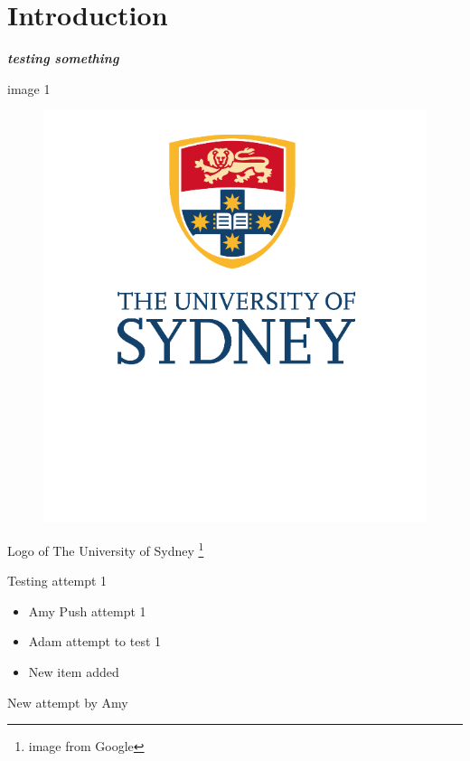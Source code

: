 \documentclass[10pt]{article}
\newcommand{\boldit}[1]{\textbf{\textit{#1}}}
\begin{document}
\section{\textsf{Introduction}}
\boldit{testing something}

image 1 
\begin{figure}[hbt!]
  \centering
  \includegraphics{usyd}
\end{figure}

Logo of The University of Sydney \footnote{image from Google}

Testing attempt 1
\begin{itemize}
  \item Amy Push attempt 1
  \item Adam attempt to test 1
  \item New item added
\end{itemize}

New attempt by Amy
\end{document}

